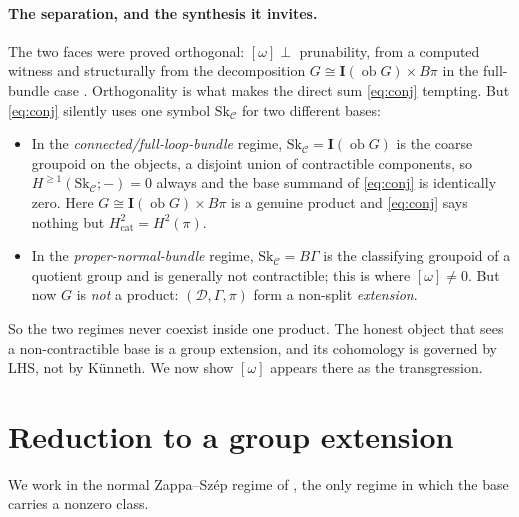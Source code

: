 \documentclass[11pt]{article}
\theoremstyle{definition}
\newcommand{\ob}{\operatorname{ob}}
\newcommand{\Sk}{\mathrm{Sk}}
\newcommand{\C}{\mathcal{C}}
\newcommand{\D}{\mathcal{D}}
\newcommand{\Igp}{\mathbf{I}}
\newcommand{\Bpi}{B\pi}
\begin{document}
\paragraph{The separation, and the synthesis it invites.} The two faces were proved
orthogonal: $[\omega]\perp$ prunability, from a computed witness \cite{sep} and structurally
from the decomposition $G\cong\Igp(\ob G)\times\Bpi$ in the full-bundle case \cite[T2]{sep2}.
Orthogonality is what makes the direct sum \eqref{eq:conj} tempting. But \eqref{eq:conj}
silently uses one symbol $\Sk_\C$ for two different bases:
\begin{itemize}
\item In the \emph{connected/full-loop-bundle} regime, $\Sk_\C=\Igp(\ob G)$ is the coarse
groupoid on the objects, a disjoint union of contractible components, so
$H^{\ge1}(\Sk_\C;-)=0$ always and the base summand of \eqref{eq:conj} is identically zero.
Here $G\cong\Igp(\ob G)\times\Bpi$ is a genuine product and \eqref{eq:conj} says nothing but
$H^2_{\mathrm{cat}}=H^2(\pi)$.
\item In the \emph{proper-normal-bundle} regime, $\Sk_\C=B\Gamma$ is the classifying groupoid
of a quotient group and is generally not contractible; this is where $[\omega]\neq0$. But now
$G$ is \emph{not} a product: $(\D,\Gamma,\pi)$ form a non-split \emph{extension}.
\end{itemize}
So the two regimes never coexist inside one product. The honest object that sees a
non-contractible base is a group extension, and its cohomology is governed by LHS, not by
K\"unneth. We now show $[\omega]$ appears there as the transgression.

\section{Reduction to a group extension}\label{sec:reduce}

We work in the normal Zappa--Sz\'ep regime of \cite{gzs}, the only regime in which the base
carries a nonzero class.
\end{document}
